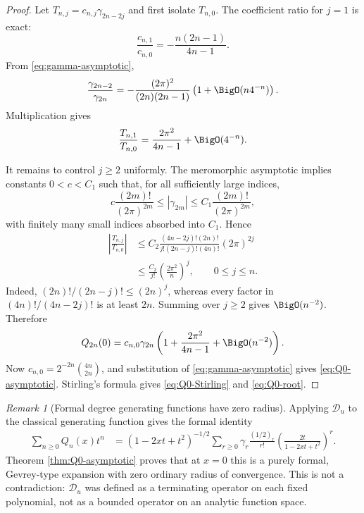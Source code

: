 \documentclass[11pt]{article}
\theoremstyle{definition}
\theoremstyle{remark}
\newtheorem{remark}[theorem]{Remark}
\newcommand{\Dscr}{\mathscr D_{u}}
\begin{document}
\begin{proof}
Let $T_{n,j}=c_{n,j}\gamma_{2n-2j}$ and first isolate $T_{n,0}$.  The
coefficient ratio for $j=1$ is exact:
\begin{equation}
 \frac{c_{n,1}}{c_{n,0}}=-\frac{n(2n-1)}{4n-1}.
 \label{eq:c-ratio-one}
\end{equation}
From \eqref{eq:gamma-asymptotic},
\begin{equation}
 \frac{\gamma_{2n-2}}{\gamma_{2n}}
 =-\frac{(2\pi)^2}{(2n)(2n-1)}
 \left(1+\BigO(n4^{-n})\right).
 \label{eq:gamma-ratio-one}
\end{equation}
Multiplication gives
\begin{equation}
 \frac{T_{n,1}}{T_{n,0}}
 =\frac{2\pi^2}{4n-1}+\BigO(4^{-n}).
 \label{eq:first-correction}
\end{equation}

It remains to control $j\ge2$ uniformly.  The meromorphic asymptotic implies
constants $0<c<C_1$ such that, for all sufficiently large indices,
\[
 c\frac{(2m)!}{(2\pi)^{2m}}
 \le|\gamma_{2m}|\le
 C_1\frac{(2m)!}{(2\pi)^{2m}},
\]
with finitely many small indices absorbed into $C_1$.  Hence
\begin{align*}
 \left|\frac{T_{n,j}}{T_{n,0}}\right|
 &\le C_2
 \frac{(4n-2j)!(2n)!}{j!(2n-j)!(4n)!}(2\pi)^{2j}\\
 &\le \frac{C_2}{j!}\left(\frac{2\pi^2}{n}\right)^j,
 \qquad 0\le j\le n.
\end{align*}
Indeed, $(2n)!/(2n-j)!\le(2n)^j$, whereas every factor in
$(4n)!/(4n-2j)!$ is at least $2n$.  Summing over $j\ge2$ gives
$\BigO(n^{-2})$.  Therefore
\[
 Q_{2n}(0)=c_{n,0}\gamma_{2n}
 \left(1+\frac{2\pi^2}{4n-1}+\BigO(n^{-2})\right).
\]
Now $c_{n,0}=2^{-2n}\binom{4n}{2n}$, and substitution of
\eqref{eq:gamma-asymptotic} gives \eqref{eq:Q0-asymptotic}.  Stirling's
formula gives \eqref{eq:Q0-Stirling} and \eqref{eq:Q0-root}.
\end{proof}

\begin{remark}[Formal degree generating functions have zero radius]
Applying $\Dscr$ to the classical generating function gives the formal identity
\begin{align}
 \sum_{n\ge0}Q_n(x)t^n
 &=(1-2xt+t^2)^{-1/2}
 \sum_{r\ge0}\gamma_r\frac{(1/2)_r}{r!}
 \left(\frac{2t}{1-2xt+t^2}\right)^r.
 \label{eq:formal-Q-generating}
\end{align}
Theorem \ref{thm:Q0-asymptotic} proves that at $x=0$ this is a purely formal,
Gevrey-type expansion with zero ordinary radius of convergence.  This is not a
contradiction: $\Dscr$ was defined as a terminating operator on each fixed
polynomial, not as a bounded operator on an analytic function space.
\end{remark}
\end{document}
